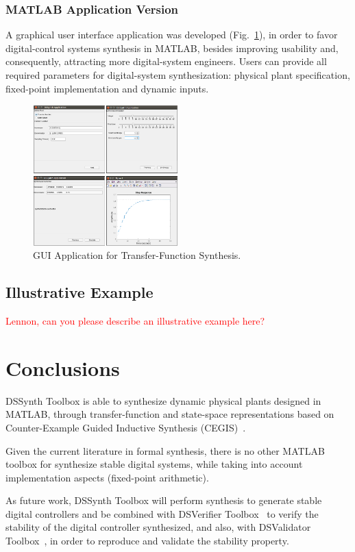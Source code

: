 \documentclass[sigconf]{acmart}
\newcommand\tool{{DSSynth Toolbox}\xspace}
\begin{document}
\subsubsection{MATLAB Application Version} 

A graphical user interface application was developed (Fig.~\ref{fig:gui-for-tf}), in order to favor digital-control systems synthesis in MATLAB, besides improving usability and, consequently, attracting more digital-system engineers. Users can provide all required parameters for digital-system synthesization: physical plant specification, fixed-point implementation and dynamic inputs. 
%
\begin{figure}
  \includegraphics[width=0.5\textwidth]{screens_dssynth.png}
  \caption{GUI Application for Transfer-Function Synthesis.}
  \label{fig:gui-for-tf}
\end{figure}


\subsection{Illustrative Example}

\textcolor{red}{Lennon, can you please describe an illustrative example here?}


\section{Conclusions}

\tool is able to synthesize dynamic physical plants designed in MATLAB, through transfer-function and state-space representations based on Counter-Example Guided Inductive Synthesis (CEGIS)~\cite{DBLP:conf/asplos/Solar-LezamaTBSS06}.

Given the current literature in formal synthesis, there is no other MATLAB toolbox for synthesize stable digital systems, while taking into account implementation aspects (fixed-point arithmetic). 

As future work, \tool will perform synthesis to generate stable digital controllers and be combined with DSVerifier Toolbox~\cite{issta2017} to verify the stability of the digital controller synthesized, and also, with DSValidator Toolbox~\cite{dsvalidator}, in order to reproduce and validate the stability property.  



 
\end{document}
